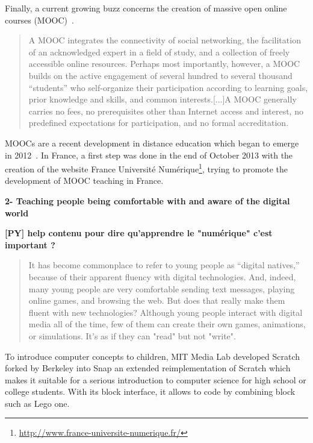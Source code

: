 Finally, a current growing buzz concerns the creation of massive open online courses (MOOC)~\cite{mackness2010ideals}.

\begin{quotation}
    A MOOC integrates the connectivity of social networking, the facilitation of an acknowledged expert in a field of study, and a collection of freely accessible online resources. Perhaps most importantly, however, a MOOC builds on the active engagement of several hundred to several thousand “students” who self-organize their participation according to learning goals, prior knowledge and skills, and common interests.[...]A MOOC generally carries no fees, no prerequisites other than Internet access and interest, no predefined expectations for participation, and no formal accreditation.
\end{quotation}

MOOCs are a recent development in distance education which began to emerge in 2012~\cite{pappano2012year}. In France, a first step was done in the end of October 2013 with the creation of the website France Université Numérique\footnote{\url{http://www.france-universite-numerique.fr/}}, trying to promote the development of MOOC teaching in France.


\textbf{2- Teaching people being comfortable with and aware of the digital world}

\textbf{[PY] help contenu pour dire qu'apprendre le "numérique" c'est important ?}

\begin{quotation}

    It has become commonplace to refer to young people as “digital natives,” because of their apparent fluency with digital technologies. And, indeed, many young people are very comfortable sending text messages, playing online games, and browsing the web. But does that really make them fluent with new technologies? Although young people interact with digital media all of the time, few of them can create their own games, animations, or simulations. It’s as if they can "read" but not "write".

\end{quotation}

To introduce computer concepts to children, MIT Media Lab developed Scratch~\cite{resnick2009scratch} forked by Berkeley into Snap an extended reimplementation of Scratch which makes it suitable for a serious introduction to computer science for high school or college students. With its block interface, it allows to code by combining block such as Lego one.

